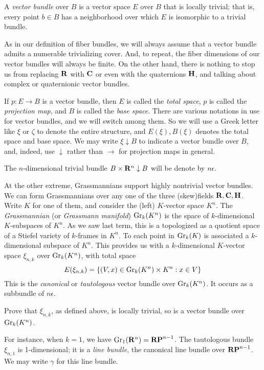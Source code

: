 \begin{definition}
A \emph{vector bundle} over $B$ is a vector space $E$ over $B$ that is locally
trivial; that is, every point $b\in B$ has a neighborhood over which $E$ is
isomorphic to a trivial bundle. 
\end{definition}
\begin{remark}
As in our definition of fiber bundles, we will always assume that a vector
bundle admits a numerable trivializing cover. And, to repeat, the fiber
dimensions of our vector bundles will always be finite. On the other hand,
there is nothing to stop us from replacing $\mathbf R$ with $\mathbf C$ or even with
the quaternions $\mathbf H$, and talking about complex or quaternionic vector
bundles. 
\end{remark}
If $p:E\to B$ is a vector bundle, then $E$ is called the \emph{total space},
$p$ is called the \emph{projection map}, and $B$ is called the \emph{base
space}. There are various notations in use for vector bundles, and we will
switch among them. So we will use a Greek letter like $\xi$ or $\zeta$ to 
denote the entire structure, and $E(\xi),B(\xi)$ denotes the total
space and base space. We may write $\xi\downarrow B$ to indicate a vector
bundle over $B$, and, indeed, use $\downarrow$ rather than $\to$ for
projection maps in general. 
\begin{example}
The $n$-dimensional trivial bundle $B\times\mathbf R^n\downarrow B$ 
will be denote by $n\epsilon$. 
\end{example}
\begin{example}
\label{grassmannianvb}
At the other extreme,
Grassmannians support highly nontrivial vector bundles.
We can form Grassmannians over any one of the three (skew)fields $\mathbf R,\mathbf C,\mathbf H$.
Write $K$ for one of them, and consider the (left) $K$-vector space $K^n$. 
The {\em Grassmannian} (or {\em Grassmann manifold}) $\mathrm{Gr}_k(K^n)$ is 
the space of $k$-dimensional $K$-subspaces of $K^n$. As we saw last term,
this is a topologized as a quotient space of a Stiefel variety of $k$-frames
in $K^n$. To each point in $\mathrm{Gr}_k(K)$ is associated a $k$-dimensional subspace
of $K^n$. This provides us with a $k$-dimensional $K$-vector space $\xi_{n,k}$
over $\mathrm{Gr}_k(K^n)$, with total space
\begin{equation*}
	    E(\xi_{n,k}) = \{(V,x)\in\mathrm{Gr}_k(K^n)\times K^n:x\in V\}
	\end{equation*}
This is the {\em canonical} or {\em tautologous} vector bundle over 
$\mathrm{Gr}_k(K^n)$. It occurs as a subbundle of $n\epsilon$.  
	\begin{exercise}
	    Prove that $\xi_{n,k}$, as defined above, is locally trivial, so
	    is a vector bundle over $\mathrm{Gr}_k(K^n)$.
	\end{exercise}
	    For instance, when $k=1$, we have $\mathrm{Gr}_1(\mathbf R^n) = \mathbf{RP}^{n-1}$.
The tautologous bundle $\xi_{n,1}$ is 1-dimensional; it is a {\em line bundle},
the canonical line bundle over $\mathbf{RP}^{n-1}$. We may write $\gamma$ for
this line bundle.  
\end{example}

